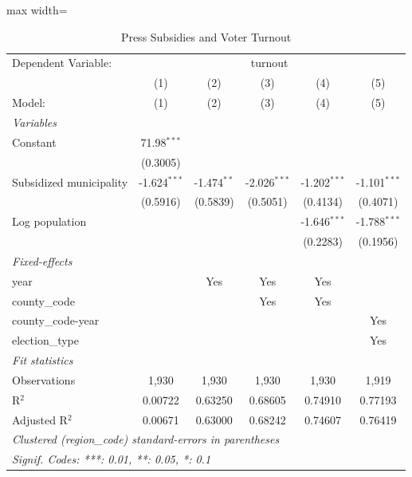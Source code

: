 
\begin{table}[htbp]
   \caption{\label{tab:main} Press Subsidies and Voter Turnout}
   \centering
   \begin{adjustbox}{max width=\textwidth}
   \begin{tabular}{lccccc}
      \tabularnewline \midrule \midrule
      Dependent Variable: & \multicolumn{5}{c}{turnout}\\
                              & (1)            & (2)           & (3)            & (4)            & (5) \\   
      Model:                  & (1)            & (2)           & (3)            & (4)            & (5)\\  
      \midrule
      \emph{Variables}\\
      Constant                & 71.98$^{***}$  &               &                &                &   \\   
                              & (0.3005)       &               &                &                &   \\   
      Subsidized municipality & -1.624$^{***}$ & -1.474$^{**}$ & -2.026$^{***}$ & -1.202$^{***}$ & -1.101$^{***}$\\   
                              & (0.5916)       & (0.5839)      & (0.5051)       & (0.4134)       & (0.4071)\\   
      Log population          &                &               &                & -1.646$^{***}$ & -1.788$^{***}$\\   
                              &                &               &                & (0.2283)       & (0.1956)\\   
      \midrule
      \emph{Fixed-effects}\\
      year                    &                & Yes           & Yes            & Yes            & \\  
      county\_code            &                &               & Yes            & Yes            & \\  
      county\_code-year       &                &               &                &                & Yes\\  
      election\_type          &                &               &                &                & Yes\\  
      \midrule
      \emph{Fit statistics}\\
      Observations            & 1,930          & 1,930         & 1,930          & 1,930          & 1,919\\  
      R$^2$                   & 0.00722        & 0.63250       & 0.68605        & 0.74910        & 0.77193\\  
      Adjusted R$^2$          & 0.00671        & 0.63000       & 0.68242        & 0.74607        & 0.76419\\  
      \midrule \midrule
      \multicolumn{6}{l}{\emph{Clustered (region\_code) standard-errors in parentheses}}\\
      \multicolumn{6}{l}{\emph{Signif. Codes: ***: 0.01, **: 0.05, *: 0.1}}\\
   \end{tabular}
   \end{adjustbox}
   

\end{table}
